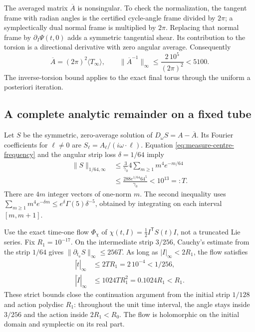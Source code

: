 The averaged matrix $\overline A$ is nonsingular. To check the
normalization, the tangent frame with radian angles is the certified
cycle-angle frame divided by $2\pi$; a symplectically dual normal
frame is multiplied by $2\pi$. Replacing that normal frame by
$\partial_I\Psi(t,0)$ adds a symmetric tangential shear. Its contribution
to the torsion is a directional derivative with zero angular average.
Consequently
\begin{equation}
 \overline A=(2\pi)^2\langle T_\infty\rangle,\qquad
 \|\overline A^{-1}\|_\infty
 \leq\frac{2\,10^5}{(2\pi)^2}<5100.
 \label{eq:measure-twist-normalization}
\end{equation}
The inverse-torsion bound applies to the exact final torus through
the uniform a posteriori iteration.

\subsection{A complete analytic remainder on a fixed tube}
\label{sec:measure-tube-normal-form}

Let $S$ be the symmetric, zero-average solution of
$D_\omega S=A-\overline A$. Its Fourier coefficients for $\ell\ne0$
are $S_\ell=A_\ell/(i\omega\cdot\ell)$. Equation
\eqref{eq:measure-centre-frequency} and the angular strip loss
$\delta=1/64$ imply
\begin{equation}
 \begin{aligned}
 \|S\|_{1/64,\infty}
 &\leq\frac{3}{\gamma_0}
       4\sum_{m\geq1}m^4e^{-m/64}\\
 &\leq\frac{288e^{1/64}64^5}{\gamma_0}<10^{13}=:T.
 \end{aligned}
 \label{eq:measure-homological-bound}
\end{equation}
There are $4m$ integer vectors of one-norm $m$. The second inequality
uses $\sum_{m\geq1}m^4e^{-\delta m}
\leq e^\delta\Gamma(5)\delta^{-5}$, obtained by integrating on
each interval $[m,m+1]$.

Use the exact time-one flow $\Phi_\chi$ of
$\chi(t,I)=\tfrac12 I^\mathsf TS(t)I$, not a truncated Lie series.
Fix $R_1=10^{-17}$. On the intermediate strip $3/256$, Cauchy's
estimate from the strip $1/64$ gives
$\|\partial_{t_a}S\|_\infty\leq256T$. As long as
$|I|_\infty<2R_1$, the flow satisfies
\[
 \begin{aligned}
 |\dot t|_\infty&\leq2TR_1=2\,10^{-4}<1/256,\\
 |\dot I|_\infty&\leq1024TR_1^2
       =0.1024R_1<R_1.
 \end{aligned}
\]
These strict bounds close the continuation argument from the initial
strip $1/128$ and action polydisc $R_1$: throughout the unit time
interval, the angle stays inside $3/256$ and the action inside
$2R_1<R_0$. The flow is holomorphic on the initial domain and
symplectic on its real part.

